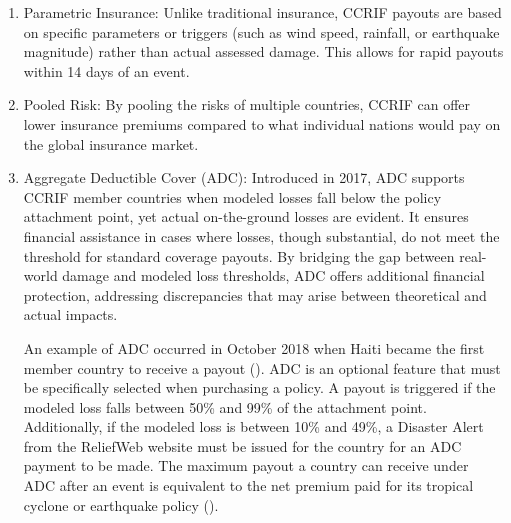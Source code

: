\documentclass[fleqn,mnsc,nonblindrev]{informs4}
\begin{document}
\begin{enumerate}[label=(\roman*)]
\item Parametric Insurance: Unlike traditional insurance, CCRIF payouts are based on specific parameters or triggers (such as wind speed, rainfall, or earthquake magnitude) rather than actual assessed damage. This allows for rapid payouts within 14 days of an event.
\item Pooled Risk: By pooling the risks of multiple countries, CCRIF can offer lower insurance premiums compared to what individual nations would pay on the global insurance market.
\item Aggregate Deductible Cover (ADC): Introduced in 2017, ADC supports CCRIF member countries when modeled losses fall below the policy attachment point, yet actual on-the-ground losses are evident. It ensures financial assistance in cases where losses, though substantial, do not meet the threshold for standard coverage payouts. By bridging the gap between real-world damage and modeled loss thresholds, ADC offers additional financial protection, addressing discrepancies that may arise between theoretical and actual impacts.

An example of ADC occurred in October 2018 when Haiti became the first member country to receive a payout (\cite{bollmann2019international}). ADC is an optional feature that must be specifically selected when purchasing a policy. A payout is triggered if the modeled loss falls between 50\% and 99\% of the attachment point. Additionally, if the modeled loss is between 10\% and 49\%, a Disaster Alert from the ReliefWeb website must be issued for the country for an ADC payment to be made. The maximum payout a country can receive under ADC after an event is equivalent to the net premium paid for its tropical cyclone or earthquake policy (\cite{ccrif_payouts}). 


\end{enumerate}
\end{document}
